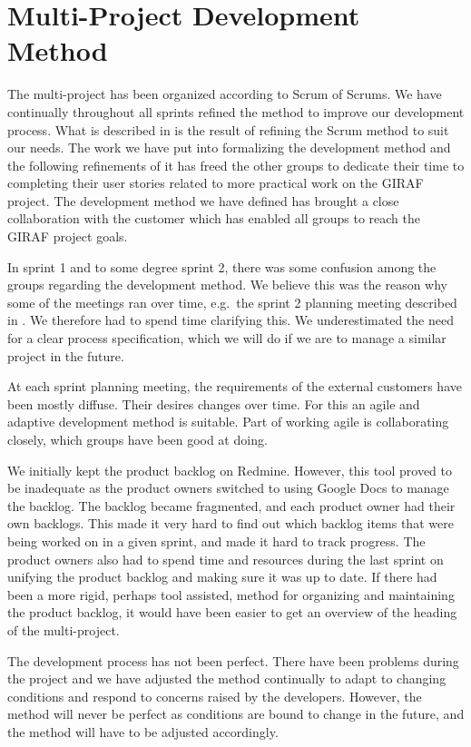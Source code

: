 \section{Multi-Project Development Method}\label{conc:multi_project_process_eval}
The multi-project has been organized according to Scrum of Scrums. We have continually throughout all sprints refined the method to improve our development process. What is described in  is the result of refining the Scrum method to suit our needs. The work we have put into formalizing the development method and the following refinements of it has freed the other groups to dedicate their time to completing their user stories related to more practical work on the GIRAF project. The development method we have defined has brought a close collaboration with the customer which has enabled all groups to reach the GIRAF project goals.

In sprint 1 and to some degree sprint 2, there was some confusion among the groups regarding the development method. We believe this was the reason why some of the meetings ran over time, e.g.\ the \db sprint 2 planning meeting described in . We therefore had to spend time clarifying this. We underestimated the need for a clear process specification, which we will do if we are to manage a similar project in the future.

At each sprint planning meeting, the requirements of the external customers have been mostly diffuse. Their desires changes over time. For this an agile and adaptive development method is suitable. Part of working agile is collaborating closely, which groups have been good at doing.

We initially kept the product backlog on Redmine. However, this tool proved to be inadequate as the product owners switched to using Google Docs to manage the backlog. The backlog became fragmented, and each product owner had their own backlogs. This made it very hard to find out which backlog items that were being worked on in a given sprint, and made it hard to track progress. The product owners also had to spend time and resources during the last sprint on unifying the product backlog and making sure it was up to date. If there had been a more rigid, perhaps tool assisted, method for organizing and maintaining the product backlog, it would have been easier to get an overview of the heading of the multi-project.

The development process has not been perfect. There have been problems during the project and we have adjusted the method continually to adapt to changing conditions and respond to concerns raised by the developers. However, the method will never be perfect as conditions are bound to change in the future, and the method will have to be adjusted accordingly.

